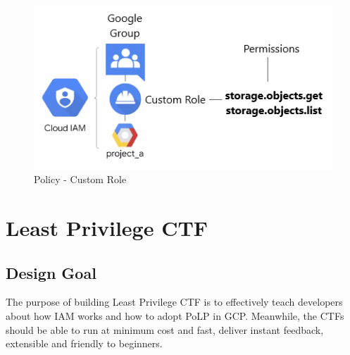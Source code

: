 \documentclass[sigconf]{acmart}
\begin{document}
\begin{figure}[h]
  \centering
  \includegraphics[width=\linewidth]{pic/sto-cus}
  \caption {Policy - Custom Role}
   \label{fig:sto-cus}
\end{figure}




\section{Least Privilege CTF}

\subsection{Design Goal}
The purpose of building Least Privilege CTF is to effectively teach developers about how IAM works and how to adopt PoLP in GCP. Meanwhile, the CTFs should be able to run at minimum cost and fast, deliver instant feedback, extensible and friendly to beginners.
\end{document}
